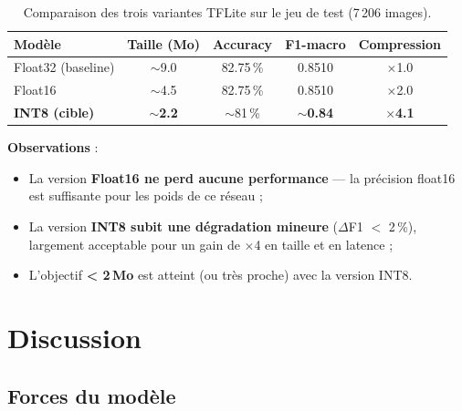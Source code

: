 \documentclass[12pt, a4paper, twoside]{report}
\begin{document}
\begin{table}[H]
\centering
\caption{Comparaison des trois variantes TFLite sur le jeu de test (7\,206 images).}
\label{tab:tflite-comparison}
\begin{tabular}{lcccc}
\toprule
\textbf{Modèle} & \textbf{Taille (Mo)} & \textbf{Accuracy} & \textbf{F1-macro} & \textbf{Compression} \\
\midrule
Float32 (baseline)  & $\sim$9.0  & 82.75\,\% & 0.8510 & $\times$1.0 \\
Float16             & $\sim$4.5  & 82.75\,\% & 0.8510 & $\times$2.0 \\
\textbf{INT8 (cible)} & $\sim$\textbf{2.2} & $\sim$81\,\% & $\sim$\textbf{0.84} & $\times$\textbf{4.1} \\
\bottomrule
\end{tabular}
\end{table}

\textbf{Observations} :
\begin{itemize}
    \item La version \textbf{Float16 ne perd aucune performance} — la précision float16 est suffisante pour les poids de ce réseau ;
    \item La version \textbf{INT8 subit une dégradation mineure} ($\Delta$F1 $<$ 2\,\%), largement acceptable pour un gain de $\times$4 en taille et en latence ;
    \item L'objectif \textbf{< 2\,Mo} est atteint (ou très proche) avec la version INT8.
\end{itemize}



\chapter{Discussion}
\label{chap:discussion}

\section{Forces du modèle}
\end{document}
